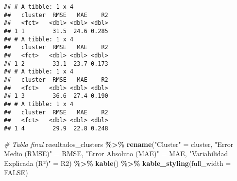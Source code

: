 \documentclass[
]{article}
\newenvironment{Shaded}{\begin{snugshade}}{\end{snugshade}}
\newcommand{\AttributeTok}[1]{\textcolor[rgb]{0.13,0.29,0.53}{#1}}
\newcommand{\CommentTok}[1]{\textcolor[rgb]{0.56,0.35,0.01}{\textit{#1}}}
\newcommand{\ConstantTok}[1]{\textcolor[rgb]{0.56,0.35,0.01}{#1}}
\newcommand{\DecValTok}[1]{\textcolor[rgb]{0.00,0.00,0.81}{#1}}
\newcommand{\FunctionTok}[1]{\textcolor[rgb]{0.13,0.29,0.53}{\textbf{#1}}}
\newcommand{\NormalTok}[1]{#1}
\newcommand{\OtherTok}[1]{\textcolor[rgb]{0.56,0.35,0.01}{#1}}
\newcommand{\SpecialCharTok}[1]{\textcolor[rgb]{0.81,0.36,0.00}{\textbf{#1}}}
\newcommand{\StringTok}[1]{\textcolor[rgb]{0.31,0.60,0.02}{#1}}
\begin{document}
\begin{Shaded}
\end{Shaded}

\begin{verbatim}
## # A tibble: 1 x 4
##   cluster  RMSE   MAE    R2
##   <fct>   <dbl> <dbl> <dbl>
## 1 1        31.5  24.6 0.285
## # A tibble: 1 x 4
##   cluster  RMSE   MAE    R2
##   <fct>   <dbl> <dbl> <dbl>
## 1 2        33.1  23.7 0.173
## # A tibble: 1 x 4
##   cluster  RMSE   MAE    R2
##   <fct>   <dbl> <dbl> <dbl>
## 1 3        36.6  27.4 0.190
## # A tibble: 1 x 4
##   cluster  RMSE   MAE    R2
##   <fct>   <dbl> <dbl> <dbl>
## 1 4        29.9  22.8 0.248
\end{verbatim}

\begin{Shaded}
\begin{Highlighting}[]
\CommentTok{\# Tabla final}
\NormalTok{resultados\_clusters }\SpecialCharTok{\%\textgreater{}\%}
  \FunctionTok{rename}\NormalTok{(}\StringTok{"Cluster"} \OtherTok{=}\NormalTok{ cluster, }\StringTok{"Error Medio (RMSE)"} \OtherTok{=}\NormalTok{ RMSE,}
         \StringTok{"Error Absoluto (MAE)"} \OtherTok{=}\NormalTok{ MAE, }\StringTok{"Variabilidad Explicada (R²)"} \OtherTok{=}\NormalTok{ R2) }\SpecialCharTok{\%\textgreater{}\%}
  \FunctionTok{kable}\NormalTok{() }\SpecialCharTok{\%\textgreater{}\%}
  \FunctionTok{kable\_styling}\NormalTok{(}\AttributeTok{full\_width =} \ConstantTok{FALSE}\NormalTok{)}
\end{Highlighting}
\end{Shaded}
\end{document}
